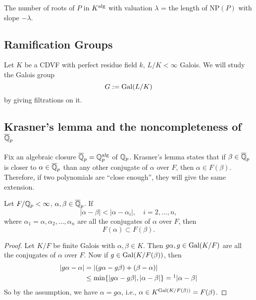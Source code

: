 \begin{theorem}
    The number of roots of $P$ in $K^{\mathrm{alg}}$ with valuation $\lambda$ = the length of $\mathrm{NP}(P)$ with slope $-\lambda$.
\end{theorem}

\subsection{Ramification Groups}

Let $K$ be a CDVF with perfect residue field $k$, $L/K<\infty$ Galois. We will study the Galois group \[G := \operatorname{Gal}(L/K)\] by giving filtrations on it.



\subsection{\texorpdfstring{Krasner's lemma and the noncompleteness of $\overline{\mathbb{Q}}_p$}{Krasner's lemma and the noncompleteness of bar Qp}}
Fix an algebraic closure $\overline{\mathbb{Q}}_p = \mathbb{Q}_p^{\mathrm{alg}}$ of $\mathbb{Q}_p$.
Krasner's lemma states that if $\beta\in\overline{\mathbb{Q}}_p$ is closer to $\alpha\in\overline{\mathbb{Q}}_p$ than any other conjugate of $\alpha$ over $F$,
then $\alpha\in F(\beta)$. Therefore, if two polynomials are ``close enough'', they will give the same extension.
\begin{theorem}
    \label{Krasner lemma}
    Let $F/\mathbb{Q}_p < \infty$, $\alpha, \beta\in \overline{\mathbb{Q}}_p$. If \[|\alpha - \beta| < |\alpha-\alpha_i|,\quad i = 2, \dots, n,\]
    where $\alpha_1 = \alpha, \alpha_2, \dots, \alpha_n$ are all the conjugates of $\alpha$ over $F$,
    then \[F(\alpha)\subset F(\beta).\]
\end{theorem}
\begin{proof}
    Let $K/F$ be finite Galois with $\alpha, \beta\in K$. Then $g\alpha, g\in\operatorname{Gal}(K/F)$ are all the conjugates of $\alpha$ over $F$.
    Now if $g\in \operatorname{Gal}(K/F(\beta))$, then \begin{align*}
        |g\alpha - \alpha|
        &= |(g\alpha - g\beta) + (\beta - \alpha)|\\ &
        \le\min\{|g\alpha - g\beta| , |\alpha - \beta|\} =\footnotemark |\alpha - \beta|
    \end{align*}
    So by the assumption,
    we have $\alpha = g\alpha$,
    i.e., $\alpha\in K^{\operatorname{Gal}(K/F(\beta))} = F(\beta)$.
\end{proof}


